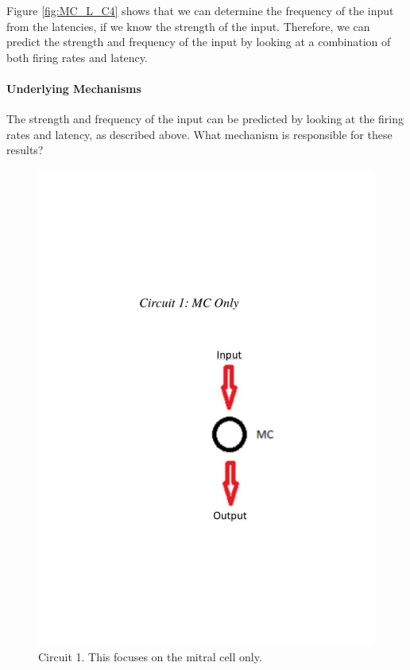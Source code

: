 \documentclass[11pt]{report}
\begin{document}
Figure \ref{fig:MC_L_C4} shows that we can determine the frequency of the input from the latencies, if we know the strength of the input. Therefore, we can predict the strength and frequency of the input by looking at a combination of both firing rates and latency.

\paragraph{Underlying Mechanisms}
The strength and frequency of the input can be predicted by looking at the firing rates and latency, as described above. What mechanism is responsible for these results?

\begin{figure}[!ht]
\centering
\includegraphics[trim={0 6cm 0 8cm},clip, scale=0.5]{Figures/Circuit_1.pdf}
\caption{Circuit 1. This focuses on the mitral cell only.}
\label{fig:Circuit_1}
\end{figure} 
\end{document}

